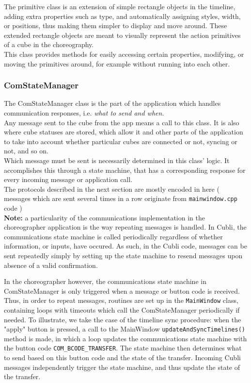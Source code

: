 The primitive class is an extension of simple rectangle objects in the timeline, adding extra properties such as type, and automatically assigning styles, width, or positions, thus making them simpler to display and move around. These extended rectangle objects are meant to visually represent the action primitives of a cube in the choreography.\\

This class provides methods for easily accessing certain properties, modifying, or moving the primitives around, for example without running into each other.

\subsubsection{ComStateManager}

 The ComStateManager class is the part of the application which handles communication responses, i.e. \textit{what to send and when}.\\
 
Any message sent to the cube from the app means a call to this class. It is also where cube statuses are stored, which allow it and other parts of the application to take into account whether particular cubes are connected or not, syncing or not, and so on.\\

Which message must be sent is necessarily determined in this class' logic.
It accomplishes this through a state machine, that has a corresponding response for every incoming message or application call.\\

The protocols described in the next section are mostly encoded in here ( messages which are sent several times in a row originate from \texttt{mainwindow.cpp} code )\\

\textbf{Note:} a particularity of the communications implementation in the choreographer application is the way repeating messages is handled. In Cubli, the communications state machine is called periodically regardless of whether information, or inputs, have occured. As such, in the Cubli code, messages can be sent repeatedly simply by setting up the state machine to resend messages upon absence of a valid confirmation.

In the choreographer however, the communications state machine in ComStateManager is only triggered when a message or button code is received. Thus, in order to repeat messages, routines are set up in the \texttt{MainWindow} class, containing loops with timeouts which call the ComStateManager periodically if needed. To illustrate, we take the case of the timeline sync procedure: when the "apply" button is pressed, a call to the MainWindow \texttt{updateAndSyncTimelines()} method is made, in which a loop updates the communications state machine with the button code \texttt{COM\_BCODE\_TRANSFER}. The state machine then determines what to send based on this button code and the state of the transfer. Incoming Cubli messages independently trigger the state machine, and thus update the state of the transfer.

